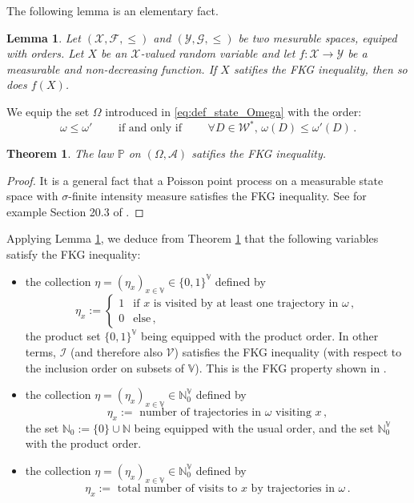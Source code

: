 \documentclass[12pt,a4paper]{article}
\newtheorem{theorem}[theo]{Theorem}
\newtheorem{lemma}[theo]{Lemma}
\newcommand{\1}[1]{{\mathbf 1}{\{#1\}}}
\newcommand{\N}{{\mathbb N}}
\newcommand{\V}{{\mathcal V}}
\newcommand{\I}{{\mathcal I}}
\newcommand{\8}{{\infty}}
\begin{document}
\smallskip

The following lemma is an elementary fact.

\begin{lemma}\label{lem:f(X)_FKG}
Let $(\mathcal{X},\mathcal{F} , \le)$ and $(\mathcal{Y}, \mathcal{G} , \le)$ be two mesurable spaces, equiped with orders. Let $X$ be an $\mathcal{X}$-valued random variable and let $f:\mathcal{X} \to \mathcal{Y}$ be a measurable and non-decreasing function. 
If $X$ satifies the FKG inequality, then so does $f(X)$.
\end{lemma}

We equip the set $\Omega$ introduced in \eqref{eq:def_state_Omega} with the order: 
\begin{equation}
\omega \le \omega'
\qquad 
\text{ if and only if } 
\qquad 
\forall D \in \mathcal{W}^* , \, \omega(D)  \le \omega'(D)\, .
\end{equation}%
\qquad 

\begin{theorem}\label{th:FKG}
The law $\mathbb{P}$ on $(\Omega, \mathcal{A})$ satifies the FKG inequality.
\end{theorem}

\begin{proof}
It is a general fact that a Poisson point process on a measurable state space with $\sigma$-finite intensity measure satisfies the FKG inequality. See for example Section 20.3 of \cite{Last2017}. 
\end{proof}

Applying Lemma \ref{lem:f(X)_FKG}, we deduce from Theorem \ref{th:FKG} that the following variables satisfy the FKG inequality:
\begin{itemize}
\item the collection $\eta=(\eta_x)_{x\in \mathbb{V}}\in \{0, 1\}^\mathbb{V}$ defined by 
\[\eta_x := 
\begin{cases}
 1 & \text{if } x 
 \text{ is visited by at least one trajectory in }
 \omega \, , \\
0 & \text{else}  \, ,
\end{cases}
\]
the product set $ \{0, 1\}^{\mathbb{V}}$ being equipped with the product order.
In other terms, $\I$ (and therefore also $\V$) satisfies the FKG inequality (with respect to the inclusion order on subsets of $\mathbb{V}$). This is the FKG property shown in \cite{Teixeira2009}.
\item the collection $\eta=(\eta_x)_{x\in \mathbb{V}} \in \N_0^\mathbb{V}$ defined by 
\[\eta_x := 
\text{ number of trajectories in } \omega \text{ visiting } x \, ,
\]
the set $\N_0:=\{0\} \cup \N$ being equipped with the usual order, and the set $\N_0^\mathbb{V}$ with the product order.
\item the collection $\eta=(\eta_x)_{x\in \mathbb{V}} \in \N_0^\mathbb{V}$ defined by 
\[\eta_x := 
\text{ total number of visits to } x
\text{ by trajectories in } \omega\, .
\]
\end{itemize}
\end{document}
